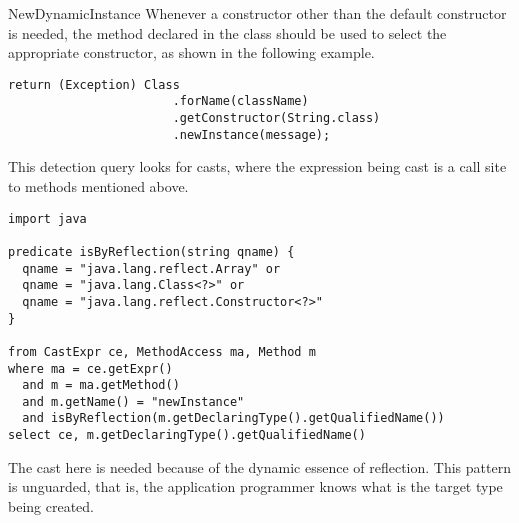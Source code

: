 \begin{pattern}{NewDynamicInstance}
Whenever a constructor other than the default constructor is needed,
the  method declared in the  class
should be used to select the appropriate constructor,
as shown in the following example.

\begin{lstlisting}[style=java,caption=Example of the \pname{} pattern using the \code{Constructor} class.]
return (Exception) Class
                       .forName(className)
                       .getConstructor(String.class)
                       .newInstance(message);
\end{lstlisting}

\detection

This detection query looks for casts,
where the expression being cast is a call site to methods mentioned above.

\begin{lstlisting}
import java

predicate isByReflection(string qname) {
  qname = "java.lang.reflect.Array" or 
  qname = "java.lang.Class<?>" or 
  qname = "java.lang.reflect.Constructor<?>"
}

from CastExpr ce, MethodAccess ma, Method m
where ma = ce.getExpr()
  and m = ma.getMethod()
  and m.getName() = "newInstance"
  and isByReflection(m.getDeclaringType().getQualifiedName())
select ce, m.getDeclaringType().getQualifiedName()
\end{lstlisting}

\discussion

The cast here is needed because of the dynamic essence of reflection.
This pattern is unguarded, that is,
the application programmer knows what is the target type being created.
\end{pattern}